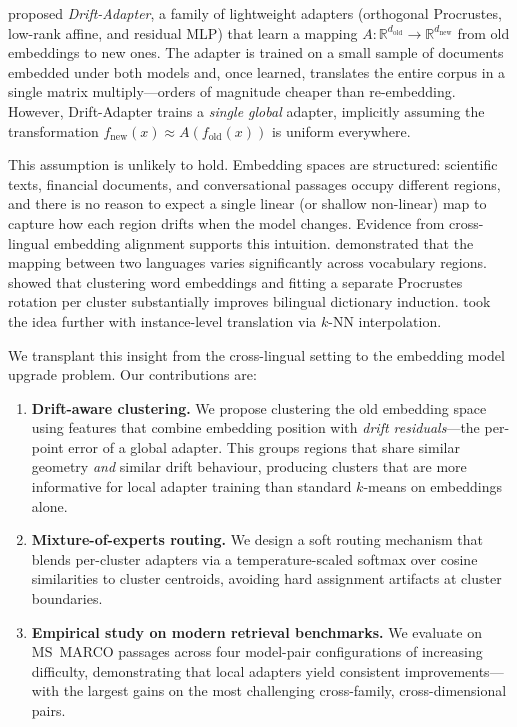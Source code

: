 \documentclass[11pt,a4paper]{article}
\newcommand{\fold}{f_{\mathrm{old}}}
\newcommand{\fnew}{f_{\mathrm{new}}}
\newcommand{\Rbb}{\mathbb{R}}
\begin{document}
\citet{vejendla2025drift} proposed \emph{Drift-Adapter}, a family of lightweight adapters (orthogonal Procrustes, low-rank affine, and residual MLP) that learn a mapping $A : \Rbb^{d_{\mathrm{old}}} \to \Rbb^{d_{\mathrm{new}}}$ from old embeddings to new ones.
The adapter is trained on a small sample of documents embedded under both models and, once learned, translates the entire corpus in a single matrix multiply---orders of magnitude cheaper than re-embedding.
However, Drift-Adapter trains a \emph{single global} adapter, implicitly assuming the transformation $\fnew(x) \approx A(\fold(x))$ is uniform everywhere.

This assumption is unlikely to hold.
Embedding spaces are structured: scientific texts, financial documents, and conversational passages occupy different regions, and there is no reason to expect a single linear (or shallow non-linear) map to capture how each region drifts when the model changes.
Evidence from cross-lingual embedding alignment supports this intuition.
\citet{nakashole2018mapping} demonstrated that the mapping between two languages varies significantly across vocabulary regions.
\citet{dan2020cluster} showed that clustering word embeddings and fitting a separate Procrustes rotation per cluster substantially improves bilingual dictionary induction.
\citet{glavas2020instamap} took the idea further with instance-level translation via $k$-NN interpolation.

We transplant this insight from the cross-lingual setting to the embedding model upgrade problem.
Our contributions are:
\begin{enumerate}[leftmargin=*,itemsep=2pt,topsep=2pt]
  \item \textbf{Drift-aware clustering.}
    We propose clustering the old embedding space using features that combine embedding position with \emph{drift residuals}---the per-point error of a global adapter.
    This groups regions that share similar geometry \emph{and} similar drift behaviour, producing clusters that are more informative for local adapter training than standard $k$-means on embeddings alone.
  \item \textbf{Mixture-of-experts routing.}
    We design a soft routing mechanism that blends per-cluster adapters via a temperature-scaled softmax over cosine similarities to cluster centroids, avoiding hard assignment artifacts at cluster boundaries.
  \item \textbf{Empirical study on modern retrieval benchmarks.}
    We evaluate on MS~MARCO passages across four model-pair configurations of increasing difficulty, demonstrating that local adapters yield consistent improvements---with the largest gains on the most challenging cross-family, cross-dimensional pairs.
\end{enumerate}
\end{document}
